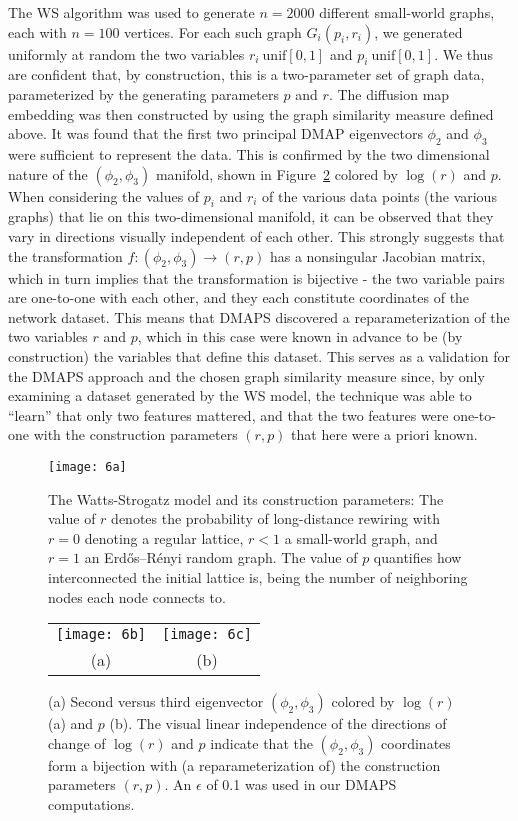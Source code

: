 The WS algorithm was used to generate $n=2000$ different small-world
graphs, each with $n=100$ vertices. For each such graph
$G_i(p_i, r_i)$, we generated uniformly at random the two variables
$r_i ~ \mathrm{unif}[0,1]$ and $p_i ~ \mathrm{unif}[0,1]$. We thus are
confident that, by construction, this is a two-parameter set of graph
data, parameterized by the generating parameters $p$ and $r$. The
diffusion map embedding was then constructed by using the graph
similarity measure defined above. It was found that the first two
principal DMAP eigenvectors $\phi_2$ and $\phi_3$ were sufficient to
represent the data. This is confirmed by the two dimensional nature of
the $(\phi_2, \phi_3)$ manifold, shown in Figure~\ref{fig:sis6bc}
colored by $\log(r)$ and $p$. When considering the values of $p_i$ and
$r_i$ of the various data points (the various graphs) that lie on this
two-dimensional manifold, it can be observed that they vary in
directions visually independent of each other. This strongly suggests
that the transformation $f:(\phi_2, \phi_3) \rightarrow (r,p)$ has a
nonsingular Jacobian matrix, which in turn implies that the
transformation is bijective - the two variable pairs are one-to-one
with each other, and they each constitute coordinates of the network
dataset. This means that DMAPS discovered a reparameterization of the
two variables $r$ and $p$, which in this case were known in advance to
be (by construction) the variables that define this dataset. This
serves as a validation for the DMAPS approach and the chosen graph
similarity measure since, by only examining a dataset generated by the
WS model, the technique was able to “learn” that only two features
mattered, and that the two features were one-to-one with the
construction parameters $(r, p)$ that here were a priori known.


\begin{figure}[!htp]
\centering
\texttt{[image: 6a]}
\caption[Variations of Watts-Strogatz model]{The Watts-Strogatz model and its construction parameters:
  The value of $r$ denotes the probability of long-distance rewiring
  with $r = 0$ denoting a regular lattice, $r < 1$ a small-world graph,
  and $r = 1$ an Erdős–Rényi random graph. The value of $p$ quantifies how
  interconnected the initial lattice is, being the number of
  neighboring nodes each node connects to. \label{fig:sis6a}}
\end{figure}

\begin{figure}[!htp]
\centering
\begin{tabular}{cc}
  \texttt{[image: 6b]} &
  \texttt{[image: 6c]}\\
  (a) & (b)
\end{tabular}
\caption[DMAPS results on Watts-Strogatz networks]{(a) Second versus third eigenvector $(\phi_2 ,\phi_3)$
  colored by $\log(r)$ (a) and $p$ (b). The visual linear independence
  of the directions of change of $\log(r)$ and $p$ indicate that the
  $(\phi_2 ,\phi_3)$ coordinates form a bijection with (a
  reparameterization of) the construction parameters $(r, p)$. An
  $\epsilon$ of 0.1 was used in our DMAPS
  computations. \label{fig:sis6bc}}
\end{figure}


